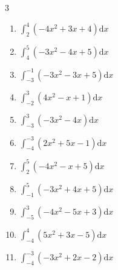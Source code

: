 \begin{multicols}{3}
\begin{enumerate}
  \item $\displaystyle \int_{2}^{4}\left( -4x^{2}+3x+4 \right) \mathrm{d}x$


  \item $\displaystyle \int_{4}^{5}\left( -3x^{2}-4x+5 \right) \mathrm{d}x$


\columnbreak %

  \item $\displaystyle \int_{-3}^{-1}\left( -3x^{2}-3x+5 \right) \mathrm{d}x$


  \item $\displaystyle \int_{-2}^{3}\left( 4x^{2}-x+1 \right) \mathrm{d}x$

        \phantom{$\displaystyle =45$}

  \item $\displaystyle \int_{-3}^{3}\left( -3x^{2}-4x \right) \mathrm{d}x$

        \phantom{$\displaystyle =-54$}

  \item $\displaystyle \int_{-4}^{-3}\left( 2x^{2}+5x-1 \right) \mathrm{d}x$

        \phantom{$\displaystyle =7$}

  \item $\displaystyle \int_{2}^{5}\left( -4x^{2}-x+5 \right) \mathrm{d}x$

        \phantom{$\displaystyle =-164$}

\columnbreak %

  \item $\displaystyle \int_{-1}^{5}\left( -3x^{2}+4x+5 \right) \mathrm{d}x$

        \phantom{$\displaystyle =-73$}

  \item $\displaystyle \int_{-5}^{3}\left( -4x^{2}-5x+3 \right) \mathrm{d}x$


  \item $\displaystyle \int_{-4}^{4}\left( 5x^{2}+3x-5 \right) \mathrm{d}x$


  \item $\displaystyle \int_{-4}^{-3}\left( -3x^{2}+2x-2 \right) \mathrm{d}x$


\end{enumerate}
\end{multicols}
